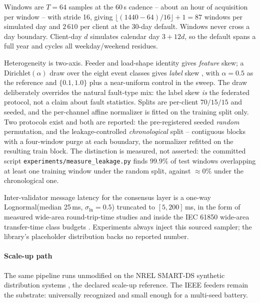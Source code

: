 \documentclass[review,12pt]{elsarticle}
\begin{document}
Windows are $T=64$ samples at the 60\,s cadence -- about an hour of
acquisition per window -- with stride 16, giving
$\lfloor(1440-64)/16\rfloor+1 = 87$ windows per simulated day and
$2\,610$ per client at the 30-day default. Windows never cross a day
boundary. Client-day $d$ simulates calendar day $3+12d$, so the default
spans a full year and cycles all weekday/weekend residues.

Heterogeneity is two-axis. Feeder and load-shape identity gives
\emph{feature} skew; a Dirichlet$(\alpha)$ draw over the eight event
classes gives \emph{label} skew \cite{hsu2019}, with $\alpha=0.5$ as the
reference and $\{0.1, 1.0\}$ plus a near-uniform control in the sweep.
The draw deliberately overrides the natural fault-type mix: the label
skew \emph{is} the federated protocol, not a claim about fault
statistics. Splits are per-client $70/15/15$ and seeded, and the
per-channel affine normalizer is fitted on the training split only. Two
protocols exist and both are reported: the pre-registered seeded
\emph{random} permutation, and the leakage-controlled
\emph{chronological} split -- contiguous blocks with a four-window purge
at each boundary, the normalizer refitted on the resulting train block.
The distinction is measured, not asserted: the committed script
\texttt{experiments/measure\_leakage.py} finds $99.9\%$ of test windows
overlapping at least one training window under the random split, against
$\approx 0\%$ under the chronological one.

Inter-validator message latency for the consensus layer is a one-way
Lognormal(median 25\,ms, $\sigma_{\ln}=0.5$) truncated to
$[5,200]$\,ms, in the form of measured wide-area round-trip-time studies
\cite{aikat2003} and inside the IEC 61850 wide-area transfer-time class
budgets \cite{iec61850-90-12}. Experiments always inject this sourced
sampler; the library's placeholder distribution backs no reported
number.

\paragraph{Scale-up path}
The same pipeline runs unmodified on the NREL SMART-DS synthetic
distribution systems \cite{smartds}, the declared scale-up reference.
The IEEE feeders remain the substrate: universally recognized and small
enough for a multi-seed battery.
\end{document}
